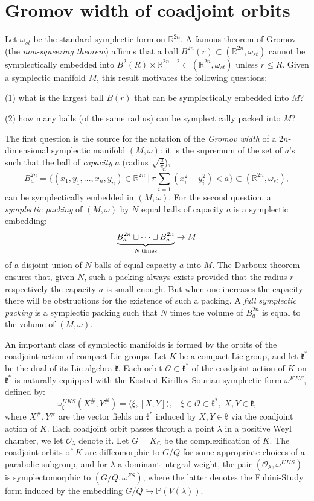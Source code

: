 \documentclass{emsprocart}
\theoremstyle{definition}
\begin{document}
\section{Gromov width of coadjoint orbits}\label{Gromov}
Let $\omega_{st}$ be the standard symplectic form on $\mathbb R^{2n}$. 
A famous theorem of Gromov (the {\it non-squeezing theorem}) affirms that a ball $B^{2n}(r)\subset (\mathbb R^{2n}, \omega_{st})$ 
cannot be symplectically embedded into $B^2(R)\times \mathbb R^{2n-2}\subset  (\mathbb R^{2n}, \omega_{st})$ unless $r\leq R$.
Given a symplectic manifold $M$, this result motivates the following questions:
\par\noindent
(1) what is the largest ball $B(r)$ that can be symplectically embedded into $M$? 
\par\noindent
(2) how many balls (of the same radius) can be symplectically packed into $M$? 

The first question is the source for the notation of the {\it Gromov width} of a $2n$-dimensional symplectic manifold $(M,\omega)$: it 
is the supremum of the set of $a$'s such that the ball of {\it capacity} $a$ (radius $\sqrt{\frac{a}{\pi}}$),
$$
B^{2n}_a = \big \{ (x_1,y_1,\ldots,x_n,y_n) \in  \mathbb R^{2n} \ \Big | \ \pi \sum_{i=1}^n (x_i^2+y_i^2) < a \big 
\} \subset  (\mathbb R^{2n}, \omega_{st}),
$$
 can be symplectically
embedded in $(M,\omega)$.  For the second question, a \emph{symplectic packing} of $(M,\omega)$ by $N$ equal balls of capacity $a$ is a symplectic embedding:
$$
\underbrace{B^{2n}_a\sqcup \cdots \sqcup B^{2n}_a}_{N\, {\rm times}}\rightarrow M
$$
of a disjoint union of $N$ balls of equal capacity $a$ into $M$. The Darboux theorem ensures that,
given $N$, such a packing always exists provided that the radius $r$ respectively the capacity $a$ is small enough. But when
one increases the capacity there will be obstructions for the existence of such a packing. A {\it full symplectic packing}
is a symplectic packing such that $N$ times the volume of $B^{2n}_a$ is equal to the volume of $(M,\omega)$.

An important class of symplectic manifolds is formed by the orbits of the coadjoint action of compact Lie groups.
Let $K$ be a compact Lie group, and  let $\mathfrak k^*$ be the dual of its Lie algebra $\mathfrak k$. 
Each orbit 
$\mathcal{O}\subset \mathfrak k^*$ of the coadjoint action of $K$ on $\mathfrak k^*$
is naturally equipped with the Kostant-Kirillov-Souriau symplectic form $\omega^{KKS}$, defined by:
$$\omega^{KKS}_{\xi}(X^\#,Y^\#)=\langle \xi, [X,Y]\rangle,\;\;\;\xi \in \mathcal{O} \subset \mathfrak k^*,\;X,Y \in \mathfrak k,$$
where $X^\#,Y^\#$ are the vector fields on $\mathfrak k^*$ induced by $X,Y \in \mathfrak k$ via the coadjoint action of $K$. Each coadjoint orbit passes through a point $\lambda$ in a positive Weyl chamber, we let $\mathcal{O}_\lambda$ denote it. Let $G=K_{\mathbb C}$ be the complexification of $K$. The coadjoint orbits of $K$ are diffeomorphic to $G/Q$
for some appropriate choices of a parabolic subgroup, and for $\lambda$ a dominant integral weight,
the pair $(\mathcal{O_\lambda}, \omega^{KKS})$ is symplectomorphic to $(G/Q,\omega^{FS})$, where the latter
denotes the Fubini-Study form induced by the embedding $G/Q\hookrightarrow \mathbb P(V(\lambda))$.
\end{document}
